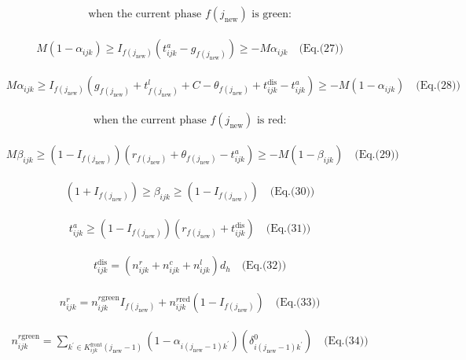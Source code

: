 \documentclass[10pt]{article}
\begin{document}
\[\begin{aligned}&\quad \text{when the current phase } f(j_{\text{new}}) \text{ is green:}\end{aligned}\]

\[\begin{aligned}&\quad M(1 - \alpha_{ijk}) \geq I_{f(j_{\text{new}})}(t^{a}_{ijk} - g_{f(j_{\text{new}})}) \geq -M \alpha_{ijk} \quad \text{(Eq.(27))}\end{aligned}\]

\[\begin{aligned}&\quad M \alpha_{ijk} \geq I_{f(j_{\text{new}})}(g_{f(j_{\text{new}})} + t^{l}_{f(j_{\text{new}})} + C - \theta_{f(j_{\text{new}})} + t^{\text{dis}}_{ijk} - t^{a}_{ijk}) \geq -M(1 - \alpha_{ijk}) \quad \text{(Eq.(28))}\end{aligned}\]

\[\begin{aligned}&\quad \text{when the current phase } f(j_{\text{new}}) \text{ is red:}\end{aligned}\]

\[\begin{aligned}&\quad M \beta_{ijk} \geq (1 - I_{f(j_{\text{new}})})(r_{f(j_{\text{new}})} + \theta_{f(j_{\text{new}})} - t^{a}_{ijk}) \geq -M(1 - \beta_{ijk}) \quad \text{(Eq.(29))}\end{aligned}\]

\[\begin{aligned}&\quad (1 + I_{f(j_{\text{new}})}) \geq \beta_{ijk} \geq (1 - I_{f(j_{\text{new}})}) \quad \text{(Eq.(30))}\end{aligned}\]

\[\begin{aligned}&\quad t^{a}_{ijk} \geq (1 - I_{f(j_{\text{new}})})(r_{f(j_{\text{new}})} + t^{\text{dis}}_{ijk}) \quad \text{(Eq.(31))}\end{aligned}\]

\[\begin{aligned}&\quad t^{\text{dis}}_{ijk} = (n^{r}_{ijk} + n^{c}_{ijk} + n^{l}_{ijk}) d_{h} \quad \text{(Eq.(32))}\end{aligned}\]

\[\begin{aligned}&\quad n^{r}_{ijk} = n^{r \text{green}}_{ijk} I_{f(j_{\text{new}})} + n^{r \text{red}}_{ijk} (1 - I_{f(j_{\text{new}})}) \quad \text{(Eq.(33))}\end{aligned}\]

\[\begin{aligned}&\quad n^{r \text{green}}_{ijk} = \sum_{k^{\prime} \in K^{\text{front}}_{ijk}(j_{\text{new}}-1)} (1 - \alpha_{i(j_{\text{new}}-1)k^{\prime}})(\delta^{0}_{i(j_{\text{new}}-1)k^{\prime}}) \quad \text{(Eq.(34))}\end{aligned}\]
\end{document}
